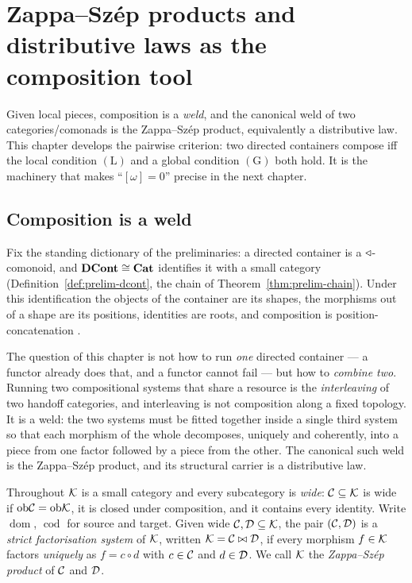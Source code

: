 \chapter{Zappa--Sz\'ep products and distributive laws as the composition tool}
\label{ch:zs}
Given local pieces, composition is a \emph{weld}, and the canonical weld of two
categories/comonads is the Zappa--Sz\'ep product, equivalently a distributive
law. This chapter develops the pairwise criterion: two directed containers
compose iff the local condition $(\mathrm{L})$ and a global condition
$(\mathrm{G})$ both hold. It is the machinery that makes ``$[\omega]=0$'' precise
in the next chapter.

\section{Composition is a weld}\label{sec:zs-weld}

Fix the standing dictionary of the preliminaries: a directed container is a
$\triangleleft$-comonoid, and $\mathbf{DCont}\cong\mathbf{Cat}$ identifies it with a small category
(Definition~\ref{def:prelim-dcont}, the chain of Theorem~\ref{thm:prelim-chain}).
Under this identification the objects of the container are its shapes, the
morphisms out of a shape are its positions, identities are roots, and composition
is position-concatenation \cite{AU16}.

The question of this chapter is not how to run \emph{one} directed container --- a
functor already does that, and a functor cannot fail --- but how to \emph{combine
two}. Running two compositional systems that share a resource is the
\emph{interleaving} of two handoff categories, and interleaving is not composition
along a fixed topology. It is a weld: the two systems must be fitted together
inside a single third system so that each morphism of the whole decomposes,
uniquely and coherently, into a piece from one factor followed by a piece from the
other. The canonical such weld is the Zappa--Sz\'ep product, and its structural
carrier is a distributive law.

\begin{definition}\label{def:zs-sfs}
Throughout $\mathcal{K}$ is a small category and every subcategory is \emph{wide}: $\mathcal{C}
\subseteq\mathcal{K}$ is wide if $\mathrm{ob}\mathcal{C}=\mathrm{ob}\mathcal{K}$, it is closed under composition, and it
contains every identity. Write $\operatorname{dom}$, $\operatorname{cod}$ for
source and target. Given wide $\mathcal{C},\mathcal{D}\subseteq\mathcal{K}$, the pair $(\mathcal{C},\mathcal{D})$ is a
\emph{strict factorisation system} of $\mathcal{K}$, written $\mathcal{K}=\mathcal{C}\bowtie\mathcal{D}$, if every
morphism $f\in\mathcal{K}$ factors \emph{uniquely} as $f=c\circ d$ with $c\in\mathcal{C}$ and $d\in
\mathcal{D}$. We call $\mathcal{K}$ the \emph{Zappa--Sz\'ep product} of $\mathcal{C}$ and $\mathcal{D}$.
\end{definition}


